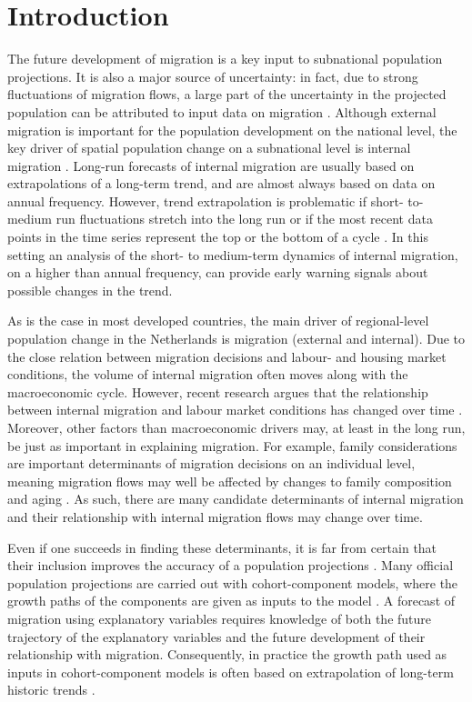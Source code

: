 \documentclass[12pt, a4paper]{article}
\begin{document}
\section{Introduction}\label{introduction}

The future development of migration is a key input to subnational population projections. It is also a major source of uncertainty: in fact, due to strong fluctuations of migration flows, a large part of the uncertainty in the projected population can be attributed to input data on migration \citep{beer1993forecast}. Although external migration is important for the population development on the national level, the key driver of spatial population change on a subnational level is internal migration \citet[see e.g., ][]{matthews2013progress, raymer2019spatial}. Long-run forecasts of internal migration are usually based on extrapolations of a long-term trend, and are almost always based on data on annual frequency. However, trend extrapolation is problematic if short- to-medium run fluctuations stretch into the long run or if the most recent data points in the time series represent the top or the bottom of a cycle \citep{canova1998detrending, hamilton2018}. In this setting an analysis of the short- to medium-term dynamics of internal migration, on a higher than annual frequency, can provide early warning signals about possible changes in the trend. 

As is the case in most developed countries, the main driver of
regional-level population change in the Netherlands is migration
(external and internal). Due to the close relation between migration
decisions and labour- and housing market conditions, the volume of
internal migration often moves along with the macroeconomic cycle. However,
recent research argues that the relationship between internal migration and labour market conditions has changed over time \citep{kaplan2017understanding}. Moreover, other
factors than macroeconomic drivers may, at least in the long run, be just as important in explaining migration. For example, family considerations are important
determinants of migration decisions on an individual level, meaning
migration flows may well be affected by changes to family composition
and aging \citep{mulder2018putting}. As such, there are many candidate determinants of internal migration and their relationship with internal migration flows may change over time.

Even if one succeeds in finding these determinants, it is far from certain that 
their inclusion improves the accuracy of a population projections \citep{smith1997further}. Many official population projections are carried out with cohort-component
models, where the growth paths of the components are given as inputs to
the model \citep[see e.g., ][]{de2005achtergronden}. A forecast of migration using explanatory variables requires knowledge of both the future trajectory of the explanatory variables and the future development of their relationship with migration.
Consequently, in practice the growth path used as inputs in
cohort-component models is often based on extrapolation of
long-term historic trends \citep{smith2013practitioner}.
\end{document}
